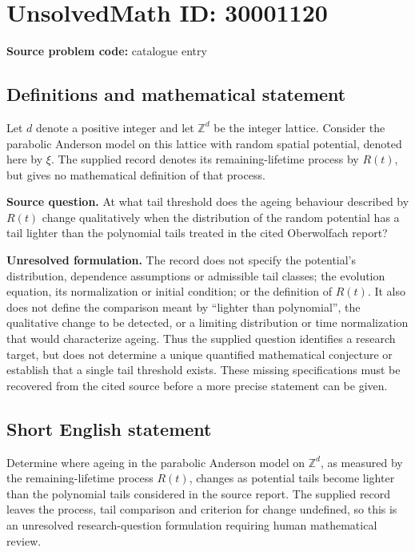 \documentclass[11pt]{article}
\newcommand{\Z}{\mathbb{Z}}
\begin{document}
\section*{UnsolvedMath ID: 30001120}
\textbf{Source problem code:} catalogue entry
\subsection{Definitions and mathematical statement}
Let \(d\) denote a positive integer and let \(\Z^d\) be the integer lattice. Consider the parabolic Anderson model on this lattice with random spatial potential, denoted here by \(\xi\). The supplied record denotes its remaining-lifetime process by \(R(t)\), but gives no mathematical definition of that process.

\textbf{Source question.} At what tail threshold does the ageing behaviour described by \(R(t)\) change qualitatively when the distribution of the random potential has a tail lighter than the polynomial tails treated in the cited Oberwolfach report?

\textbf{Unresolved formulation.} The record does not specify the potential's distribution, dependence assumptions or admissible tail classes; the evolution equation, its normalization or initial condition; or the definition of \(R(t)\). It also does not define the comparison meant by ``lighter than polynomial'', the qualitative change to be detected, or a limiting distribution or time normalization that would characterize ageing. Thus the supplied question identifies a research target, but does not determine a unique quantified mathematical conjecture or establish that a single tail threshold exists. These missing specifications must be recovered from the cited source before a more precise statement can be given.
\subsection{Short English statement}
Determine where ageing in the parabolic Anderson model on \(\Z^d\), as measured by the remaining-lifetime process \(R(t)\), changes as potential tails become lighter than the polynomial tails considered in the source report. The supplied record leaves the process, tail comparison and criterion for change undefined, so this is an unresolved research-question formulation requiring human mathematical review.
\end{document}
